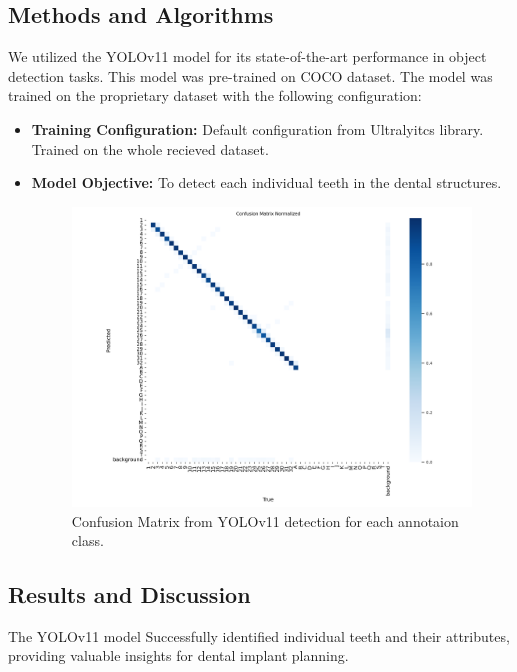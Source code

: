 \documentclass[12pt]{article}
\begin{document}
\subsection{Methods and Algorithms}
We utilized the YOLOv11 model for its state-of-the-art performance in object detection tasks. This model was pre-trained on COCO dataset. The model was trained on the proprietary dataset with the following configuration:
\begin{itemize}
    \item \textbf{Training Configuration:} Default configuration from Ultralyitcs library. Trained on the whole recieved dataset.
    \item \textbf{Model Objective:} To detect each individual teeth in the dental structures.
    \begin{figure}[H]
    \centering
    \includegraphics[width=0.6\linewidth]{confusion_matrix_normalized.png}
    \caption{Confusion Matrix from YOLOv11 detection for each annotaion class.}
    \label{fig:yolo-output}
\end{figure}
\end{itemize}

\subsection{Results and Discussion}
The YOLOv11 model Successfully identified individual teeth and their attributes, providing valuable insights for dental implant planning.
\end{document}
